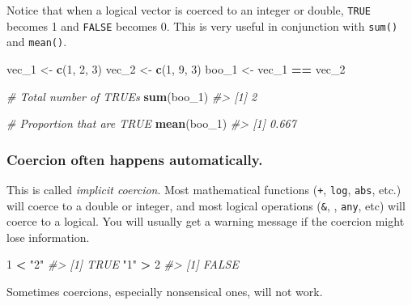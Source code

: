 \documentclass[
]{book}
\newenvironment{Shaded}{\begin{snugshade}}{\end{snugshade}}
\newcommand{\CommentTok}[1]{\textcolor[rgb]{0.56,0.35,0.01}{\textit{#1}}}
\newcommand{\DecValTok}[1]{\textcolor[rgb]{0.00,0.00,0.81}{#1}}
\newcommand{\KeywordTok}[1]{\textcolor[rgb]{0.13,0.29,0.53}{\textbf{#1}}}
\newcommand{\NormalTok}[1]{#1}
\newcommand{\OperatorTok}[1]{\textcolor[rgb]{0.81,0.36,0.00}{\textbf{#1}}}
\newcommand{\StringTok}[1]{\textcolor[rgb]{0.31,0.60,0.02}{#1}}
\begin{document}
Notice that when a logical vector is coerced to an integer or double, \texttt{TRUE} becomes 1 and \texttt{FALSE} becomes 0. This is very useful in conjunction with \texttt{sum()} and \texttt{mean()}.

\begin{Shaded}
\begin{Highlighting}[]
\NormalTok{vec_}\DecValTok{1}\NormalTok{ <-}\StringTok{ }\KeywordTok{c}\NormalTok{(}\DecValTok{1}\NormalTok{, }\DecValTok{2}\NormalTok{, }\DecValTok{3}\NormalTok{)}
\NormalTok{vec_}\DecValTok{2}\NormalTok{ <-}\StringTok{ }\KeywordTok{c}\NormalTok{(}\DecValTok{1}\NormalTok{, }\DecValTok{9}\NormalTok{, }\DecValTok{3}\NormalTok{)}
\NormalTok{boo_}\DecValTok{1}\NormalTok{ <-}\StringTok{ }\NormalTok{vec_}\DecValTok{1} \OperatorTok{==}\StringTok{ }\NormalTok{vec_}\DecValTok{2}

\CommentTok{# Total number of TRUEs}
\KeywordTok{sum}\NormalTok{(boo_}\DecValTok{1}\NormalTok{)}
\CommentTok{#> [1] 2}

\CommentTok{# Proportion that are TRUE}
\KeywordTok{mean}\NormalTok{(boo_}\DecValTok{1}\NormalTok{)}
\CommentTok{#> [1] 0.667}
\end{Highlighting}
\end{Shaded}

\hypertarget{coercion-often-happens-automatically.}{%
\subsubsection*{Coercion often happens automatically.}\label{coercion-often-happens-automatically.}}

This is called \emph{implicit coercion}. Most mathematical functions (\texttt{+}, \texttt{log}, \texttt{abs}, etc.) will coerce to a double or integer, and most logical operations (\texttt{\&}, \texttt{\textbar{}}, \texttt{any}, etc) will coerce to a logical. You will usually get a warning message if the coercion might lose information.

\begin{Shaded}
\begin{Highlighting}[]
\DecValTok{1} \OperatorTok{<}\StringTok{ "2"}
\CommentTok{#> [1] TRUE}
\StringTok{"1"} \OperatorTok{>}\StringTok{ }\DecValTok{2}
\CommentTok{#> [1] FALSE}
\end{Highlighting}
\end{Shaded}

Sometimes coercions, especially nonsensical ones, will not work.
\end{document}
